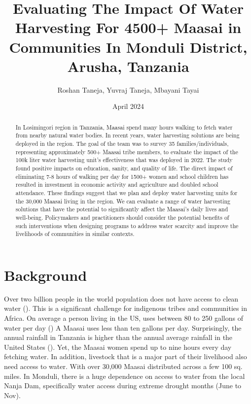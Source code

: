 \documentclass[10pt, twocolumn]{article}
\title{Evaluating The Impact Of Water Harvesting For 4500+ Maasai in Communities In Monduli District, Arusha, Tanzania}
\author{Roshan Taneja, Yuvraj Taneja, Mbayani Tayai}
\date{April 2024}
\begin{document}
\maketitle

\begin{abstract}
In Losimingori region in Tanzania, Maasai spend many hours walking to fetch water from nearby natural water bodies. In recent years, water harvesting solutions are being deployed in the region. The goal of the team was to survey 35 families/individuals, representing approximately 500+ Maasai tribe members, to evaluate the impact of the 100k liter water harvesting unit's effectiveness that was deployed in 2022. The study found positive impacts on education, sanity, and quality of life. The direct impact of eliminating 7-8 hours of walking per day for 1500+ women and school children has resulted in investment in economic activity and agriculture and doubled school attendance. These findings suggest that we plan and deploy water harvesting units for the 30,000 Maasai living in the region. We can evaluate a range of water harvesting solutions that have the potential to  significantly affect the Maasai's daily lives and well-being. Policymakers and practitioners should consider the potential benefits of such interventions when designing programs to address water scarcity and improve the livelihoods of communities in similar contexts.
\end{abstract}





















\section{Background}

Over two billion people in the world population does not have access to clean water (\autocite{UNICEF2023}). This is a significant challenge for indigenous tribes and communities in Africa. On average a person living in the US, uses between 80 to 250 gallons of water per day (\autocite{EPA})  A Maasai uses less than ten gallons per day. Surprisingly, the annual rainfall in Tanzania is higher than the annual average rainfall in the United States (\autocite{Monduli}). Yet, the Maasai women spend up to nine hours every day fetching water. In addition, livestock that is a major part of their livelihood also need access to water. With over 30,000 Maasai distributed across a few 100 sq. miles. In Monduli, there is a huge dependence on access to water from the local Nanja Dam, specifically water access during extreme drought months (June to Nov).
\end{document}
